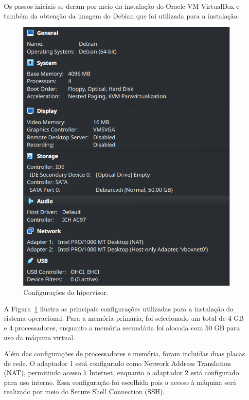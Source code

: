 \documentclass[
	12pt,				%
	oneside,   	        %
	a4paper,			%
	english,			%
	french,				%
	spanish,			%
	brazil,				%
	]{pacotes/abntex2}
\begin{document}
Os passos iniciais se deram por meio da instalação do Oracle VM VirtualBox e também da obtenção da imagem do Debian que foi utilizada para a instalação. 

\begin{figure}[H]
  \centering
  \includegraphics[scale=0.7]{figuras/vm.png}
  \caption{Configurações do hipervisor.}
  \label{fig:vm}
\end{figure}

A Figura~\ref{fig:vm} ilustra as principais configurações utilizadas para a instalação do sistema operacional. Para a memória primária, foi selecionado um total de 4 GB e 4 processadores, enquanto a memória secundária foi alocada com 50 GB para uso da máquina virtual.

Além das configurações de processadores e memória, foram incluídas duas placas de rede. O adaptador 1 está configurado como Network Address Translation (NAT), permitindo acesso à Internet, enquanto o adaptador 2 está configurado para uso interno. Essa configuração foi escolhida pois o acesso à máquina será realizado por meio do Secure Shell Connection (SSH).
\end{document}
